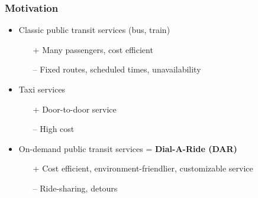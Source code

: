 \documentclass[aspectratio=1610]{beamer}
\newcommand{\important}[1]{{\color{green!60!black}#1}}
\let\oldfootnotesize\footnotesize
\renewcommand*{\footnotesize}{\oldfootnotesize\fontsize{6}{4}\selectfont}
\renewcommand{\footnotesize}{\scriptsize}
\begin{document}
\begin{frame}
	\frametitle{Motivation}%
	
\medskip
\begin{itemize}
	\item Classic public transit services (bus, train)
		\begin{itemize}
			\item[+] Many passengers, cost efficient
			\item[--] Fixed routes, scheduled times, unavailability
		\end{itemize}
	\smallskip
	\item Taxi services 
		\begin{itemize}
			\item[+] Door-to-door service 
			\item[--] High cost
		\end{itemize}
	\smallskip
	\item On-demand public transit services = \important{\bf Dial-A-Ride (DAR)}
		\begin{itemize}
			\item[+] Cost efficient, environment-friendlier, customizable service
			\item[--] Ride-sharing, detours
		\end{itemize}
\end{itemize}
	
\end{frame}
\end{document}
